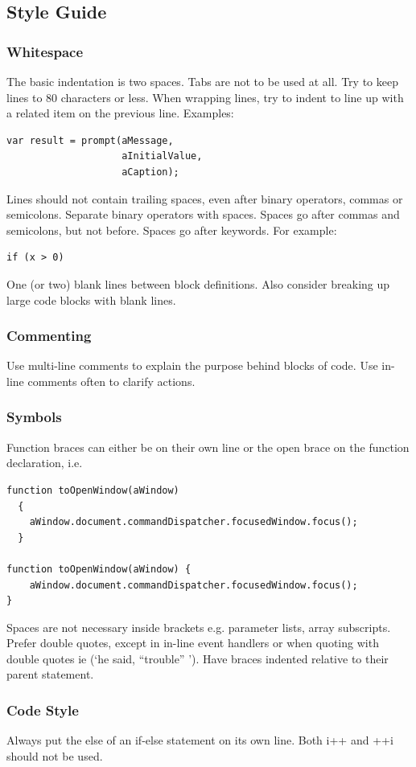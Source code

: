 \documentclass[letterpaper,12pt]{article}
\begin{document}
\subsection{Style Guide}
\subsubsection{Whitespace}
The basic indentation is two spaces. Tabs are not to be used at all.
Try to keep lines to 80 characters or less. When wrapping lines, try to indent to line up with a related item on the previous line. Examples: 
\begin{verbatim}
var result = prompt(aMessage,
                    aInitialValue,
                    aCaption);
\end{verbatim}
Lines should not contain trailing spaces, even after binary operators, commas or semicolons.
Separate binary operators with spaces.
Spaces go after commas and semicolons, but not before.
Spaces go after keywords. For example:
\begin{verbatim}
if (x > 0)
\end{verbatim}
One (or two) blank lines between block definitions. Also consider breaking up large code blocks with blank lines.

\subsubsection{Commenting}
Use multi-line comments to explain the purpose behind blocks of code.
Use in-line comments often to clarify actions.

\subsubsection{Symbols}
Function braces can either be on their own line or the open brace on the function declaration, i.e.

\begin{verbatim}
function toOpenWindow(aWindow)
  {
    aWindow.document.commandDispatcher.focusedWindow.focus();  
  }

function toOpenWindow(aWindow) {
    aWindow.document.commandDispatcher.focusedWindow.focus();  
}
\end{verbatim}
Spaces are not necessary inside brackets e.g. parameter lists, array subscripts.
Prefer double quotes, except in in-line event handlers or when quoting with double quotes ie (‘he said, “trouble” ’).
Have braces indented relative to their parent statement.
\subsubsection{Code Style}
Always put the else of an if-else statement on its own line.
Both i++ and ++i should not be used.
\end{document}
